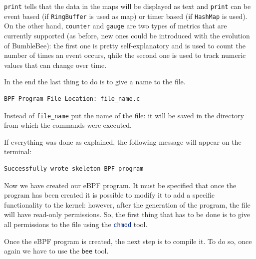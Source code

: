 \colorbox{backcolour}{\lstinline[style=highlight, language=bash]|print|} tells that the data in the maps will be displayed as text and \colorbox{backcolour}{\lstinline[style=highlight, language=bash]|print|} can be event based (if \colorbox{backcolour}{\lstinline[style=highlight, language=bash]|RingBuffer|} is used as map) or timer based (if \colorbox{backcolour}{\lstinline[style=highlight, language=bash]|HashMap|} is used).
On the other hand, \colorbox{backcolour}{\lstinline[style=highlight, language=bash]|counter|} and \colorbox{backcolour}{\lstinline[style=highlight, language=bash]|gauge|} are two types of metrics that are currently supported (as before, new ones could be introduced with the evolution of BumbleBee): the first one is pretty self-explanatory and is used to count the number of times an event occurs, qhile the second one is used to track numeric values that can change over time.

In the end the last thing to do is to give a name to the file.

\begin{lstlisting}[style=commandline, language=bash, caption={bee file location}]
	BPF Program File Location: file_name.c
\end{lstlisting}

Instead of \colorbox{backcolour}{\lstinline[style=highlight, language=bash]|file_name|} put the name of the file: it will be saved in the directory from which the commands were executed.

If everything was done as explained, the following message will appear on the terminal:

\begin{lstlisting}[style=commandline, language=bash, caption={bee successful program creation message}]
	Successfully wrote skeleton BPF program
\end{lstlisting}

Now we have created our eBPF program.
It must be specified that once the program has been created it is possible to modify it to add a specific functionality to the kernel: however, after the generation of the program, the file will have read-only permissions.
So, the first thing that has to be done is to give all permissions to the file using the \colorbox{backcolour}{\lstinline[style=highlight, language=bash]|chmod|} tool.

Once the eBPF program is created, the next step is to compile it.
To do so, once again we have to use the \colorbox{backcolour}{\lstinline[style=highlight, language=bash]|bee|} tool.

